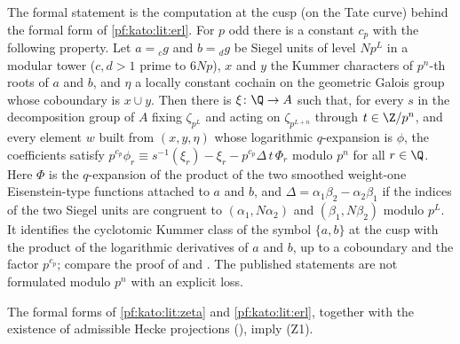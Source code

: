 \begin{remark}\label{pf:kato:rem:siegel}
The formal statement is the computation at the cusp (on the Tate curve) behind the formal form of \cref{pf:kato:lit:erl}. For $p$ odd
there is a constant $c_p$ with the following property. Let $a={}_cg$ and $b={}_dg$ be Siegel units of level $Np^L$ in a modular tower
($c,d>1$ prime to $6Np$), $x$ and $y$ the Kummer characters of $p^n$-th roots of $a$ and $b$, and $\eta$ a locally constant cochain on the
geometric Galois group whose coboundary is $x\cup y$. Then there is $\xi\colon\Q\to A$ such that, for every $s$ in the
decomposition group of $A$ fixing $\zeta_{p^L}$ and acting on $\zeta_{p^{L+n}}$ through $t\in\Z/p^n$, and every element $w$ built from
$(x,y,\eta)$ whose logarithmic $q$-expansion is $\phi$, the coefficients satisfy
$p^{c_p}\phi_r\equiv s^{-1}(\xi_r)-\xi_r-p^{c_p}\Delta\,t\,\Phi_r$ modulo $p^n$ for all $r\in\Q$. Here $\Phi$ is the $q$-expansion of the product of the
two smoothed weight-one Eisenstein-type functions attached to $a$ and $b$, and $\Delta=\alpha_1\beta_2-\alpha_2\beta_1$ if the indices of the two
Siegel units are congruent to $(\alpha_1,N\alpha_2)$ and $(\beta_1,N\beta_2)$ modulo $p^L$. It identifies the cyclotomic Kummer class of the symbol $\{a,b\}$ at the cusp with the product of the logarithmic
derivatives of $a$ and $b$, up to a coboundary and the factor $p^{c_p}$; compare the proof of \cite[Prop.~10.10]{Kato2004} and
\cite{Fukaya2003}. The published statements are not formulated modulo $p^n$ with an explicit loss.
\end{remark}

\begin{theorem}\label{pf:kato:gul}
The formal forms of \cref{pf:kato:lit:zeta} and \cref{pf:kato:lit:erl}, together with the existence of admissible Hecke projections
(), imply \textup{(Z1)}.
\end{theorem}

